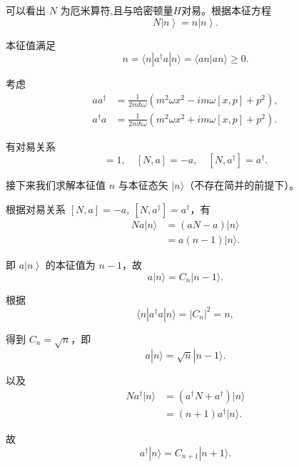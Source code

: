 可以看出 $N$ 为厄米算符,且与哈密顿量$H$对易。根据本征方程
\begin{equation}
	N\left| n \right\rangle = n\left| n \right\rangle.
\end{equation}

本征值满足
\begin{equation}
	n = \langle n | a^\dag a | n \rangle = \langle a n | a n \rangle \geqslant 0.
\end{equation}

考虑
\begin{align}
	a a^\dag &= \frac{1}{2 m \hbar \omega} \left(m^{2} \omega x^{2} - i m \omega[x, p] + p^{2}\right), \\
	a^\dag a &= \frac{1}{2 m \hbar \omega} \left(m^{2} \omega x^{2} + i m \omega[x, p] + p^{2}\right).
\end{align}

有对易关系
\begin{equation}
	[a, a^\dag] = 1, \quad [N, a] = -a, \quad [N, a^\dag] = a^\dag.
\end{equation}

接下来我们求解本征值 $n$ 与本征态矢 $| n \rangle$（不存在简并的前提下）。

根据对易关系 $[N, a] = -a, \ [N, a^\dag] = a^\dag$，有
\begin{align*}
	N a | n \rangle &= (a N - a) | n \rangle \\
	&= a(n - 1) | n \rangle.
\end{align*}

即 $a\left| n \right\rangle$ 的本征值为 $n-1$，故
\begin{equation}
	a | n \rangle = C_{n} | n-1 \rangle.
\end{equation}

根据
\begin{equation}
	\langle n | a^\dag a | n \rangle = | C_{n} |^{2} = n,
\end{equation}

得到 $C_{n} = \sqrt{n}$，即
\begin{equation}
	a | n \rangle = \sqrt{n} | n-1 \rangle.
\end{equation}

以及
\begin{align*}
	N a^\dag | n \rangle &= (a^\dag N + a^\dag) | n \rangle \\
	&= (n+1) a^\dag | n \rangle.
\end{align*}

故
\begin{equation}
	a^\dag | n \rangle = C_{n+1} | n+1 \rangle.
\end{equation}

